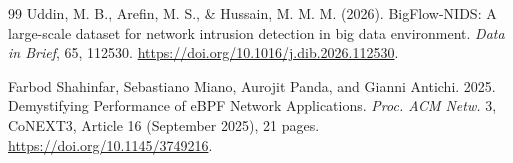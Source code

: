 \documentclass[12pt, a4paper, fontset=none]{ctexart}
\begin{document}
\begin{thebibliography}{99}
Uddin, M. B., Arefin, M. S., \& Hussain, M. M. M. (2026). BigFlow-NIDS: A large-scale dataset for network intrusion detection in big data environment. \textit{Data in Brief}, 65, 112530. \url{https://doi.org/10.1016/j.dib.2026.112530}.

Farbod Shahinfar, Sebastiano Miano, Aurojit Panda, and Gianni Antichi. 2025. Demystifying Performance of eBPF Network Applications. \textit{Proc. ACM Netw.} 3, CoNEXT3, Article 16 (September 2025), 21 pages. \url{https://doi.org/10.1145/3749216}.

\end{thebibliography}
\end{document}
